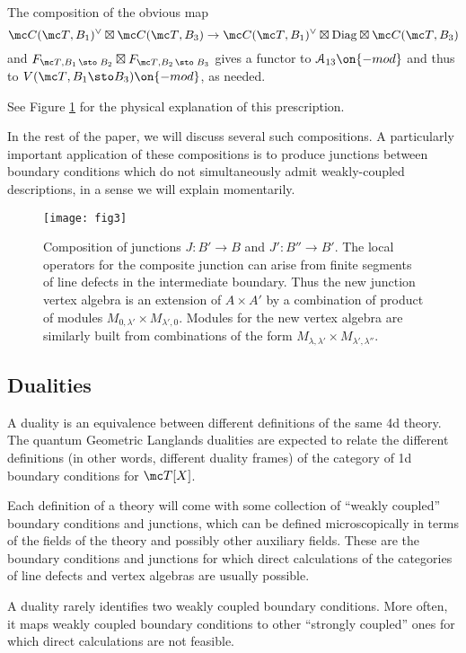 \documentclass[11pt,reqno]{amsart}
\theoremstyle{plain}
\numberwithin{equation}{section}
\theoremstyle{definition}
\begin{document}
The composition of the obvious map
$${\mc C}({\mc T},B_1)^\vee \boxtimes {\mc C}({\mc T},B_3) \to {\mc
  C}({\mc T},B_1)^\vee \boxtimes \mathrm{Diag} \boxtimes {\mc C}({\mc
  T},B_3)$$
and $F_{{\mc T},B_1 \, \sto \; B_2} \boxtimes F_{{\mc T},B_2 \, \sto
  \; B_3}$ gives a functor to ${\mathcal A}_{13}\on{-mod}$ and thus to
$V({\mc T},B_1\sto B_3)\on{-mod}$, as needed.

See Figure \ref{fig3} for the physical explanation of this prescription. 

In the rest of the paper, we will discuss several such compositions. A
particularly important application of these compositions is to produce
junctions between boundary conditions which do not simultaneously
admit weakly-coupled descriptions, in a sense we will explain momentarily. 

\begin{figure}
\center
\texttt{[image: fig3]}
\caption{Composition of junctions $J: B' \to B$ and $J': B'' \to
  B'$. The local operators for the composite junction
can arise from finite segments of line defects in the intermediate
boundary. Thus the new junction vertex algebra is an extension of
$A \times A'$ by a combination of product of modules $M_{0,\lambda'}
\times M_{\lambda',0}$. Modules for the
new vertex algebra are similarly built from combinations of the form
$M_{\lambda,\lambda'} \times M_{\lambda',\lambda''}$.
}\label{fig3}
\end{figure}

\subsection{Dualities}

A duality is an equivalence between different definitions of the same
4d theory. The quantum Geometric Langlands dualities are expected to
relate the different definitions (in other words, different duality
frames) of the category of 1d boundary conditions for ${\mc T}[X]$.

Each definition of a theory will come with some collection of ``weakly
coupled'' boundary conditions and junctions, which can be defined
microscopically in terms of the fields of the theory and possibly
other auxiliary fields. These are the boundary conditions and
junctions for which direct calculations of the categories of line
defects and vertex algebras are usually possible.

A duality rarely identifies two weakly coupled boundary
conditions. More often, it maps weakly coupled boundary conditions to
other ``strongly coupled'' ones for which direct calculations are
not feasible.
\end{document}
